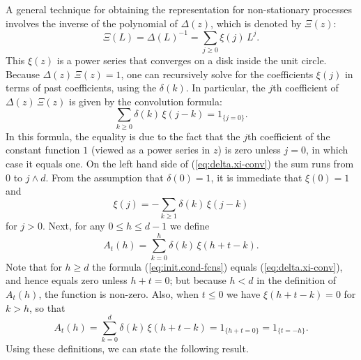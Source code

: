 \documentclass[a4paper]{book}
\begin{document}
A general technique for obtaining the representation for non-stationary 
processes involves the     inverse of the polynomial of $\Delta(z)$, which is
 denoted by $\Xi (z)$:
\begin{equation}
\label{eq:xi-def}
 \Xi (L) = {\Delta (L) }^{-1} = \sum_{j \geq 0 }  \xi (j) \, L^j.
\end{equation}
 This $\xi (z)$ is a power series that converges on a disk inside the unit circle.
  Because $\Delta (z) \, \Xi (z) = 1$, one can recursively solve for the
   coefficients $\xi (j)$ in terms of past coefficients, using the $\delta (k)$.
  In particular, the $j$th coefficient of $\Delta (z) \, \Xi (z)$ is given by
  the convolution formula:
\begin{equation}
\label{eq:delta.xi-conv}
  \sum_{k \geq 0} \delta (k) \, \xi (j-k) = 1_{ \{ j=0 \} }.
\end{equation}
  In this formula, the equality is due to the fact that the $j$th coefficient of
   the constant function $1$ (viewed as a power series in $z$) is zero unless $j=0$,
   in which case it equals one.  On the left hand side of (\ref{eq:delta.xi-conv})
   the sum runs from $0$ to  $j \wedge d$.  From the assumption that $\delta (0) =1$,
 it is immediate that $\xi (0) = 1$ and 
  \[
  \xi (j) = - \sum_{k \geq 1} \delta (k) \, \xi (j-k)
  \]
for $j > 0$.  Next, for any $ 0 \leq h \leq d-1$ we define
\begin{equation}
\label{eq:init.cond-fcns}
  A_{t} (h) = \sum_{k=0}^h \delta (k) \, \xi (h+t-k).
\end{equation}
 Note that for $h \geq d$ the formula (\ref{eq:init.cond-fcns}) equals 
 (\ref{eq:delta.xi-conv}), and hence equals zero unless $h+t = 0$; but because
$h < d$ in the definition of $A_t (h)$, the function is non-zero.
  Also, when $ t \leq 0$ we have $\xi (h+t-k) = 0$ for $ k > h$, so that
\[
 A_t (h) = \sum_{k=0}^d \delta (k) \, \xi (h+t-k)
 = 1_{ \{ h+t = 0 \} } = 1_{ \{ t = -h \}}.
\]
 Using these definitions, we can state the following result.
 
\end{document}

